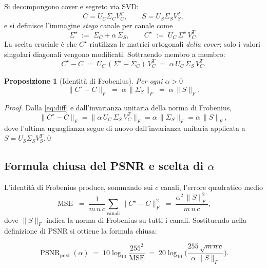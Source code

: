\documentclass[11pt,a4paper]{article}
\newtheorem{proposition}[theorem]{Proposizione}
\theoremstyle{definition}
\theoremstyle{remark}
\DeclareMathOperator{\PSNR}{PSNR}
\DeclareMathOperator{\MSE}{MSE}
\begin{document}
Si decompongono cover e segreto via SVD:
\[
  C = U_C \Sigma_C V_C^T, \qquad S = U_S \Sigma_S V_S^T,
\]
e si definisce l'immagine \emph{stego} canale per canale come
\begin{equation}\label{eq:embed}
  \Sigma^{\star} \;:=\; \Sigma_C + \alpha \, \Sigma_S,
  \qquad
  C^{\star} \;:=\; U_C \, \Sigma^{\star} \, V_C^{T}.
\end{equation}
La scelta cruciale è che $C^{\star}$ riutilizza le matrici ortogonali
\emph{della cover}; solo i valori singolari diagonali vengono modificati.
Sottraendo membro a membro:
\begin{equation}\label{eq:diff}
  C^{\star} - C \;=\; U_C \, (\Sigma^{\star} - \Sigma_C) \, V_C^T
                 \;=\; \alpha \, U_C \, \Sigma_S \, V_C^T.
\end{equation}

\begin{proposition}[Identità di Frobenius]\label{prop:frob}
Per ogni $\alpha > 0$
\begin{equation}\label{eq:frob}
  \|C^{\star} - C\|_F \;=\; \alpha \, \|\Sigma_S\|_F \;=\; \alpha \, \|S\|_F.
\end{equation}
\end{proposition}

\begin{proof}
Dalla \eqref{eq:diff} e dall'invarianza unitaria della norma di
Frobenius,
\[
  \|C^{\star} - C\|_F
  = \|\alpha\, U_C\, \Sigma_S\, V_C^T\|_F
  = \alpha\, \|\Sigma_S\|_F
  = \alpha\, \|S\|_F,
\]
dove l'ultima uguaglianza segue di nuovo dall'invarianza unitaria
applicata a $S = U_S \Sigma_S V_S^T$.\qed
\end{proof}

\subsection{Formula chiusa del PSNR e scelta di \texorpdfstring{$\alpha$}{alpha}}
\label{sec:closed-form}

L'identità di Frobenius produce, sommando sui $c$ canali, l'errore
quadratico medio
\[
  \MSE \;=\; \frac{1}{m\,n\,c}\sum_{\text{canali}} \|C^{\star} - C\|_F^2
        \;=\; \frac{\alpha^2 \, \|S\|_F^2}{m\,n\,c},
\]
dove $\|S\|_F$ indica la norma di Frobenius su tutti i canali.
Sostituendo nella definizione di PSNR si ottiene la formula chiusa:

\begin{equation}\label{eq:psnr-closed}
  \boxed{
  \PSNR_{\text{pred}}(\alpha)
   \;=\; 10\log_{10}\!\frac{255^2}{\MSE}
   \;=\; 20\log_{10}\!\Biggl( \frac{255\,\sqrt{m\,n\,c}}{\alpha\,\|S\|_F} \Biggr).
  }
\end{equation}
\end{document}
